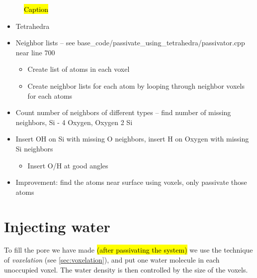 \begin{figure}[!ht]
\begin{subfigure}[b]{0.24\textwidth}
        \caption{}
    \end{subfigure}
    \caption{\hl{Caption}}
    \label{fig:passivation}
\end{figure}

\begin{itemize}
    \item Tetrahedra
    \item Neighbor lists -- see base\_code/passivate\_using\_tetrahedra/passivator.cpp near line 700
    \begin{itemize}
        \item Create list of atoms in each voxel
        \item Create neighbor lists for each atom by looping through neighbor voxels for each atoms
    \end{itemize}
    \item Count number of neighbors of different types -- find number of missing neighbors, Si - 4 Oxygen, Oxygen 2 Si
    \item Insert OH on Si with missing O neighbors, insert H on Oxygen with missing Si neighbors
    \begin{itemize}
        \item Insert O/H at good angles
    \end{itemize}
    \item Improvement: find the atoms near surface using voxels, only passivate those atoms
\end{itemize}

\section{Injecting water}
To fill the pore we have made \hl{(after passivating the system)} we use the technique of \emph{voxelation} (see \cref{sec:voxelation}), and put one water molecule in each unoccupied voxel. The water density is then controlled by the size of the voxels.


